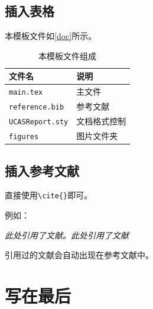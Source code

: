 \documentclass[12pt,hyperref,a4paper,UTF8]{ctexart}
\begin{document}

\subsection{插入表格}
本模板文件如\autoref{doc}所示。
\begin{table}[!htbp]
    \centering
    \begin{tabular}{l  | l}
    \hline
        文件名 & 说明 \\
        \hline
        \texttt{main.tex}  & 主文件 \\
        \texttt{reference.bib} & 参考文献 \\
        \texttt{UCASReport.sty}  & 文档格式控制\\
        \texttt{figures}  & 图片文件夹 \\
        \hline
    \end{tabular}
    \caption{本模板文件组成}
    \label{doc}
\end{table}

%
%
%
%
%
%

\subsection{插入参考文献}
直接使用\verb|\cite{}|即可。

例如：


   \textit{ 此处引用了文献\cite{0Isaac}。此处引用了文献\cite{2016The}}


引用过的文献会自动出现在参考文献中。

\section{写在最后}
\end{document}
